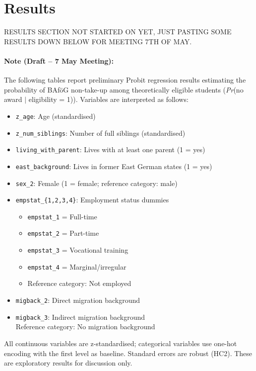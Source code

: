\section{Results}
RESULTS SECTION NOT STARTED ON YET, JUST PASTING SOME RESULTS DOWN BELOW FOR MEETING 7TH OF MAY.

\paragraph{Note (Draft – 7 May Meeting):}
The following tables report preliminary Probit regression results estimating the probability of BAföG non-take-up among theoretically eligible students (\emph{Pr}(no award $|$ eligibility = 1)). Variables are interpreted as follows:

\begin{itemize}
  \item \texttt{z\_age}: Age (standardised)
  \item \texttt{z\_num\_siblings}: Number of full siblings (standardised)
  \item \texttt{living\_with\_parent}: Lives with at least one parent (1 = yes)
  \item \texttt{east\_background}: Lives in former East German states (1 = yes)
  \item \texttt{sex\_2}: Female (1 = female; reference category: male)
  \item \texttt{empstat\_\{1,2,3,4\}}: Employment status dummies
    \begin{itemize}
      \item \texttt{empstat\_1} = Full-time
      \item \texttt{empstat\_2} = Part-time
      \item \texttt{empstat\_3} = Vocational training
      \item \texttt{empstat\_4} = Marginal/irregular
      \item Reference category: Not employed
    \end{itemize}
  \item \texttt{migback\_2}: Direct migration background
  \item \texttt{migback\_3}: Indirect migration background \\
    Reference category: No migration background
\end{itemize}

All continuous variables are z-standardised; categorical variables use one-hot encoding with the first level as baseline. Standard errors are robust (HC2). These are exploratory results for discussion only.

